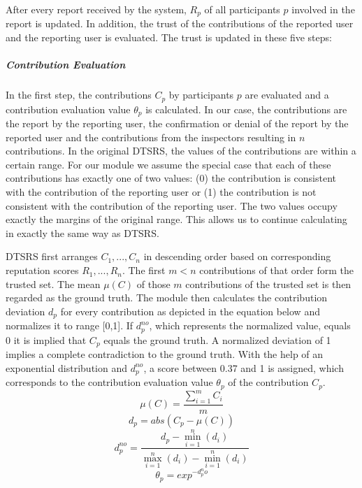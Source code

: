 After every report received by the system, $R_p$ of all participants $p$ involved in the report is updated. In addition, the trust of the contributions of the reported user and the reporting user is evaluated. The trust is updated in these five steps:

\subparagraph{Contribution Evaluation}In the first step, the contributions $C_p$ by participants $p$ are evaluated and a contribution evaluation value $\theta_p $ is calculated. In our case, the contributions are the report by the reporting user, the confirmation or denial of the report by the reported user and the contributions from the inspectors resulting in $n$ contributions. In the original DTSRS, the values of the contributions are within a certain range. For our module we assume the special case that each of these contributions has exactly one of two values: (0) the contribution is consistent with the contribution of the reporting user or (1) the contribution is not consistent with the contribution of the reporting user. The two values occupy exactly the margins of the original range. This allows us to continue calculating in exactly the same way as DTSRS.

DTSRS first arranges ${C_1, ..., C_n}$ in descending order based on corresponding reputation scores ${R_1, ..., R_n}$. The first $m<n$ contributions of that order form the trusted set. The mean $\mu(C)$ of those $m$ contributions of the trusted set is then regarded as the ground truth. The module then calculates the contribution deviation $d_p$ for every contribution as depicted in the equation below and normalizes it to range [0,1].  If $d_p^{no}$, which represents the normalized value, equals 0 it is implied that $C_p$ equals the ground truth. A normalized deviation of 1 implies a complete contradiction to the ground truth. With the help of an exponential distribution and $d_p^{no}$, a score between 0.37 and 1 is assigned, which corresponds to the contribution evaluation value $\theta_p $ of the contribution $C_p$.\\

\begin{equation}
  \mu(C)= \frac{\sum_{i=1}^{m} C_i}{m}
\end{equation}
\begin{equation}
  d_p = abs(C_p - \mu(C))
\end{equation}
\begin{equation}
  d_p^{no} = \frac{d_p-\min_{i=1}^{n}(d_i)}{\max_{i=1}^{n}(d_i) - \min_{i=1}^{n}(d_i)}
\end{equation}
\begin{equation}
  \theta_p = exp^{-d_p^no}
\end{equation}

